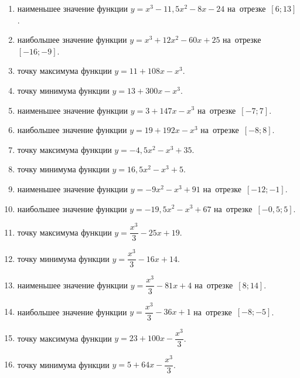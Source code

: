 \documentclass[a4paper,10pt]{article}
\begin{document}
\begin{enumerate}
\item {} наименьшее значение функции $y=x^3 -11,5x^2-8x-24$ на~отрезке~$\left[6;13\right]$.

\item {} наибольшее значение функции $y=x^3 +12x^2-60x+25$ на~отрезке~$\left[-16;-9\right]$.

\item {} точку максимума функции $y=11+108x-x^3$.

\item {} точку минимума функции $y=13+300x-x^3$.

\item {} наименьшее значение функции $y=3+147x-x^3$ на~отрезке~$\left[-7;7\right]$.

\item {} наибольшее значение функции $y=19+192x-x^3$ на~отрезке~$\left[-8;8\right]$.

\item {} точку максимума функции $y=-4,5x^2-x^3+35$.

\item {} точку минимума функции $y=16,5x^2-x^3+5$.

\item {} наименьшее значение функции $y=-9x^2-x^3+91$ на~отрезке~$\left[-12;-1\right]$.

\item {} наибольшее значение функции $y=-19,5x^2-x^3+67$ на~отрезке~$\left[-0,5;5\right]$.

\item {} точку максимума функции $y=\dfrac{x^3}{3} -25x+19$.

\item {} точку минимума функции $y=\dfrac{x^3}{3} -16x+14$.

\item {} наименьшее значение функции $y=\dfrac{x^3}{3} -81x+4$ на~отрезке~$\left[8;14\right]$.

\item {} наибольшее значение функции $y=\dfrac{x^3}{3} -36x+1$ на~отрезке~$\left[-8;-5\right]$.

\item {} точку максимума функции $y=23 +100x-\dfrac{x^3}{3}$.

\item {} точку минимума функции $y=5 +64x-\dfrac{x^3}{3}$.


\end{enumerate}
\end{document}
